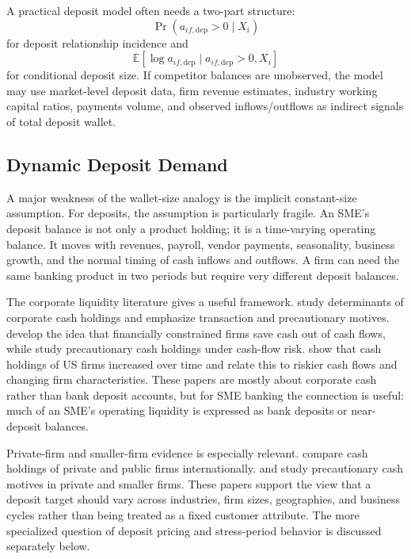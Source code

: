 \documentclass[11pt]{article}
\begin{document}
A practical deposit model often needs a two-part structure:
\[
  \Pr(a_{if,\mathrm{dep}}>0\mid X_i)
\]
for deposit relationship incidence and
\[
  \mathbb{E}[\log a_{if,\mathrm{dep}}\mid a_{if,\mathrm{dep}}>0,X_i]
\]
for conditional deposit size. If competitor balances are unobserved, the model
may use market-level deposit data, firm revenue estimates, industry working
capital ratios, payments volume, and observed inflows/outflows as indirect
signals of total deposit wallet.

\subsection{Dynamic Deposit Demand}

A major weakness of the wallet-size analogy is the implicit constant-size
assumption. For deposits, the assumption is particularly fragile. An SME's
deposit balance is not only a product holding; it is a time-varying operating
balance. It moves with revenues, payroll, vendor payments, seasonality, business
growth, and the normal timing of cash inflows and outflows. A firm can need the
same banking product in two periods but require very different deposit balances.

The corporate liquidity literature gives a useful framework. \citet{opler1999cash}
study determinants of corporate cash holdings and emphasize transaction and
precautionary motives. \citet{almeida2004cash} develop the idea that financially
constrained firms save cash out of cash flows, while \citet{han2007precautionary}
study precautionary cash holdings under cash-flow risk. \citet{bates2009cash}
show that cash holdings of US firms increased over time and relate this to
riskier cash flows and changing firm characteristics. These papers are mostly
about corporate cash rather than bank deposit accounts, but for SME banking the
connection is useful: much of an SME's operating liquidity is expressed as bank
deposits or near-deposit balances.

Private-firm and smaller-firm evidence is especially relevant. \citet{mortal2020private}
compare cash holdings of private and public firms internationally.
\citet{poti2020privatecash} and \citet{lefebvre2021cash} study precautionary
cash motives in private and smaller firms. These papers support the view that a
deposit target should vary across industries, firm sizes, geographies, and
business cycles rather than being treated as a fixed customer attribute. The
more specialized question of deposit pricing and stress-period behavior is
discussed separately below.
\end{document}
